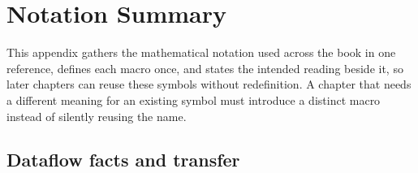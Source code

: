 \chapter{Notation Summary}
\label{ch:app-c-notation}

This appendix gathers the mathematical notation used across the book in one reference, defines each macro once, and states the intended reading beside it, so later chapters can reuse these symbols without redefinition.
A chapter that needs a different meaning for an existing symbol must introduce a distinct macro instead of silently reusing the name.

\section{Dataflow facts and transfer}
\label{sec:app-c-dataflow}

